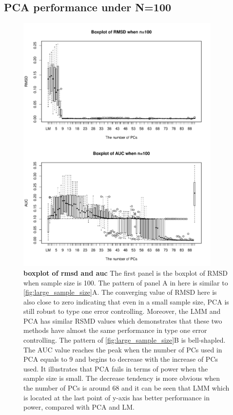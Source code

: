 \documentclass[12pt]{article}
\begin{document}
\subsection{PCA performance under N=100}
\begin{figure}[bp!]
  \centering
  \includegraphics[width=4in]{PCA_n_100_m_10_k_10.pdf}
  \caption{
    {\bf boxplot of rmsd and auc}
    The first panel is the boxplot of RMSD when sample size is 100.
    The pattern of panel A in here is similar to \cref{fig:large_sample_size}A.
    The converging value of RMSD here is also close to zero indicating that even in a small sample size, PCA is still robust to type one error controlling.
    Moreover, the LMM and PCA has similar RSMD values which demonstrates that these two methods have almost the same performance in type one error controlling.
    The pattern of \cref{fig:large_sample_size}B is bell-shapled.
    The AUC value reaches the peak when the number of PCs used in PCA equals to 9 and begins to decrease with the increase of PCs used.
    It illustrates that PCA fails in terms of power when the sample size is small.
    The decrease tendency is more obvious when the number of PCs is around 68 and it can be seen that LMM which is located at the last point of y-axis has better performance in power, compared with PCA and LM.
  }
  \label{fig:small_sample_size}
\end{figure}
\end{document}
